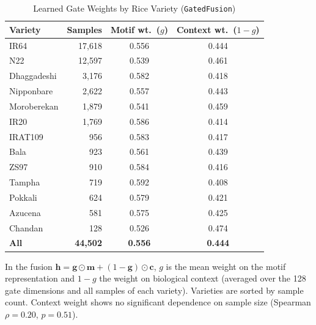 \begin{table}[!t]
\centering
\begin{threeparttable}
\caption{Learned Gate Weights by Rice Variety (\texttt{GatedFusion})}
\label{tab:gate_by_variety}
\renewcommand{\arraystretch}{1.2}
\begin{tabular}{lrcc}
\hline
\textbf{Variety} & \textbf{Samples} & \textbf{Motif wt.\ ($g$)} & \textbf{Context wt.\ ($1{-}g$)} \\
\hline
IR64 & 17,618 & 0.556 & 0.444 \\
N22 & 12,597 & 0.539 & 0.461 \\
Dhaggadeshi & 3,176 & 0.582 & 0.418 \\
Nipponbare & 2,622 & 0.557 & 0.443 \\
Moroberekan & 1,879 & 0.541 & 0.459 \\
IR20 & 1,769 & 0.586 & 0.414 \\
IRAT109 & 956 & 0.583 & 0.417 \\
Bala & 923 & 0.561 & 0.439 \\
ZS97 & 910 & 0.584 & 0.416 \\
Tampha & 719 & 0.592 & 0.408 \\
Pokkali & 624 & 0.579 & 0.421 \\
Azucena & 581 & 0.575 & 0.425 \\
Chandan & 128 & 0.526 & 0.474 \\
\hline
\textbf{All} & \textbf{44,502} & \textbf{0.556} & \textbf{0.444} \\
\hline
\end{tabular}
\begin{tablenotes}\small
\item In the fusion $\mathbf{h}=\mathbf{g}\odot\mathbf{m}+(1-\mathbf{g})\odot\mathbf{c}$, $g$ is the mean weight on the motif representation and $1{-}g$ the weight on biological context (averaged over the 128 gate dimensions and all samples of each variety). Varieties are sorted by sample count. Context weight shows no significant dependence on sample size (Spearman $\rho=0.20$, $p=0.51$).
\end{tablenotes}
\end{threeparttable}
\end{table}
